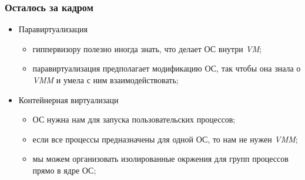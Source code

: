 \begin{frame}
\frametitle{Осталось за кадром}
\begin{itemize}
  \item<1-> Паравиртуализация
    \begin{itemize}
      \item гиппервизору полезно иногда знать, что делает ОС внутри \emph{VM};
      \item паравиртуализация предполагает модификацию ОС, так чтобы она знала о
            \emph{VMM} и умела с ним взаимодействовать;
    \end{itemize}
  \item<2-> Контейнерная виртуализаци
    \begin{itemize}
      \item ОС нужна нам для запуска пользовательских процессов;
      \item если все процессы предназначены для одной ОС, то нам не нужен
            \emph{VMM};
      \item мы можем организовать изолированные окржения для групп процессов
            прямо в ядре ОС;
    \end{itemize}
\end{itemize}
\end{frame}

